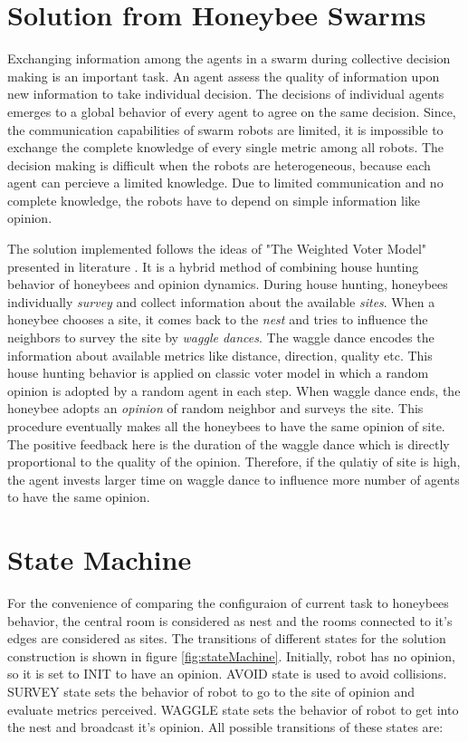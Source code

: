 \documentclass{llncs}
\begin{document}
	\section{Solution from Honeybee Swarms} \label{sec:introduction}
	Exchanging information among the agents in a swarm during collective decision making is an important task. An agent assess the quality of information upon new information to take individual decision. The decisions of individual agents emerges to a global behavior of every agent to agree on the same decision. Since, the communication capabilities of swarm robots are limited, it is impossible to exchange the complete knowledge of every single metric among all robots. The decision making is difficult when the robots are heterogeneous, because each agent can percieve a limited knowledge. Due to limited communication and no complete knowledge, the robots have to depend on simple information like opinion.
	
	The solution implemented follows the ideas of "The Weighted Voter Model" presented in literature \cite{Valentini:2014:SCD:2615731.2615742}. It is a hybrid method of combining house hunting behavior of honeybees and opinion dynamics. During house hunting, honeybees individually \textit{survey} and collect information about the available \textit{sites}. When a honeybee chooses a site, it comes back to the \textit{nest} and tries to influence the neighbors to survey the site by \textit{waggle dances}. The waggle dance encodes the information about available metrics like distance, direction, quality etc. This house hunting behavior is applied on classic voter model in which a random opinion is adopted by a random agent in each step. When waggle dance ends, the honeybee adopts an \textit{opinion} of random neighbor and surveys the site. This procedure eventually makes all the honeybees to have the same opinion of site. The positive feedback here is the duration of the waggle dance which is directly proportional to the quality of the opinion. Therefore, if the qulatiy of site is high, the agent invests larger time on waggle dance to influence more number of agents to have the same opinion.

	\section{State Machine}	\label{sec:stateMachine}
	For the convenience of comparing the configuraion of current task to honeybees behavior, the central room is considered as nest and the rooms connected to it's edges are considered as sites. The transitions of different states for the solution construction is shown in figure \ref{fig:stateMachine}. Initially, robot has no opinion, so it is set to INIT to have an opinion. AVOID state is used to avoid collisions. SURVEY state sets the behavior of robot to go to the site of opinion and evaluate metrics perceived. WAGGLE state sets the behavior of robot to get into the nest and broadcast it's opinion. All possible transitions of these states are:
	
\end{document}
